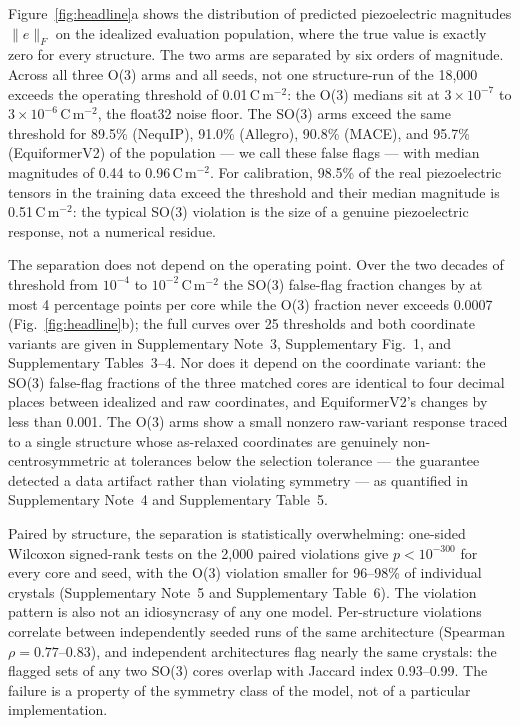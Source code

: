 Figure~\ref{fig:headline}a shows the distribution of predicted piezoelectric magnitudes $\lVert e \rVert_F$ on the idealized evaluation population, where the true value is exactly zero for every structure. The two arms are separated by six orders of magnitude. Across all three O(3) arms and all seeds, not one structure-run of the 18,000 exceeds the operating threshold of 0.01\,C\,m$^{-2}$: the O(3) medians sit at $3\times10^{-7}$ to $3\times10^{-6}$\,C\,m$^{-2}$, the float32 noise floor. The SO(3) arms exceed the same threshold for 89.5\% (NequIP), 91.0\% (Allegro), 90.8\% (MACE), and 95.7\% (EquiformerV2) of the population --- we call these false flags --- with median magnitudes of 0.44 to 0.96\,C\,m$^{-2}$. For calibration, 98.5\% of the real piezoelectric tensors in the training data exceed the threshold and their median magnitude is 0.51\,C\,m$^{-2}$: the typical SO(3) violation is the size of a genuine piezoelectric response, not a numerical residue.

The separation does not depend on the operating point. Over the two decades of threshold from $10^{-4}$ to $10^{-2}$\,C\,m$^{-2}$ the SO(3) false-flag fraction changes by at most 4 percentage points per core while the O(3) fraction never exceeds 0.0007 (Fig.~\ref{fig:headline}b); the full curves over 25 thresholds and both coordinate variants are given in Supplementary Note~3, Supplementary Fig.~1, and Supplementary Tables~3--4. Nor does it depend on the coordinate variant: the SO(3) false-flag fractions of the three matched cores are identical to four decimal places between idealized and raw coordinates, and EquiformerV2's changes by less than 0.001. The O(3) arms show a small nonzero raw-variant response traced to a single structure whose as-relaxed coordinates are genuinely non-centrosymmetric at tolerances below the selection tolerance --- the guarantee detected a data artifact rather than violating symmetry --- as quantified in Supplementary Note~4 and Supplementary Table~5.

Paired by structure, the separation is statistically overwhelming: one-sided Wilcoxon signed-rank tests on the 2,000 paired violations give $p<10^{-300}$ for every core and seed, with the O(3) violation smaller for 96--98\% of individual crystals (Supplementary Note~5 and Supplementary Table~6). The violation pattern is also not an idiosyncrasy of any one model. Per-structure violations correlate between independently seeded runs of the same architecture (Spearman $\rho = 0.77$--$0.83$), and independent architectures flag nearly the same crystals: the flagged sets of any two SO(3) cores overlap with Jaccard index 0.93--0.99. The failure is a property of the symmetry class of the model, not of a particular implementation.

